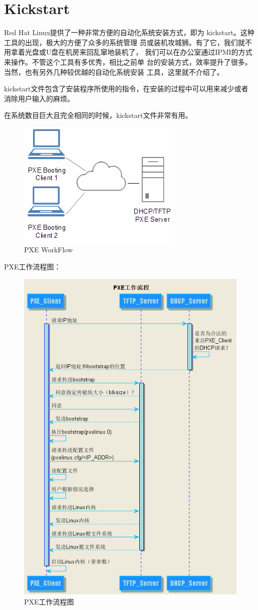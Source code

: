 \section{Kickstart}

Red Hat Linux提供了一种非常方便的自动化系统安装方式，即为
kickstart。这种工具的出现，极大的方便了众多的系统管理
员或装机攻城狮。有了它，我们就不用拿着光盘或U盘在机房来回乱窜地装机了，
我们可以在办公室通过IPMI的方式来操作。不管这个工具有多优秀，相比之前单
台的安装方式，效率提升了很多。当然，也有另外几种较优越的自动化系统安装
工具，这里就不介绍了。

kickstart文件包含了安装程序所使用的指令，在安装的过程中可以用来减少或者
消除用户输入的麻烦。

在系统数目巨大且完全相同的时候，kickstart文件非常有用。


\begin{figure}[htbp]
  \begin{center}
    \includegraphics[width=.5\textwidth]{img/PXE_diagram.png}
  \end{center}
  \caption{PXE WorkFlow}
  \label{fig:pxeWork}
\end{figure}

PXE工作流程图：
\begin{figure}[htbp]
  \begin{center}
    \includegraphics[width=.55\textwidth]{img/pxe01.png}
  \end{center}
  \caption{PXE工作流程图}
  \label{fig:pxeWorkFlow}
\end{figure}

